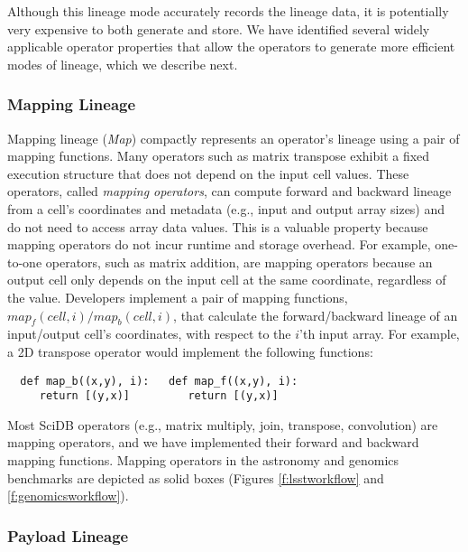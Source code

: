 Although this lineage mode accurately records the lineage data, it is
potentially very expensive to both generate and store.  We have identified
several widely applicable operator properties that allow the operators to
generate more efficient modes of lineage, which we describe next.


\subsubsection{Mapping Lineage}

Mapping lineage ({\it Map}) compactly represents an operator's lineage
using a pair of mapping functions.  Many operators such as matrix transpose
exhibit a fixed execution structure that does not depend on the input cell
values.  These operators, called {\it mapping operators}, can compute forward
and backward lineage from a cell's coordinates and metadata (e.g., input and
output array sizes) and do not need to access array data values.  This is a
valuable property because mapping operators do not incur runtime and storage
overhead.  For example, one-to-one operators, such as matrix addition, are
mapping operators because an output cell only depends on the input cell at the
same coordinate, regardless of the value.  Developers implement a pair of
mapping functions, $map_f(cell, i)/map_b(cell, i)$, that calculate the
forward/backward lineage of an input/output cell's coordinates, with respect to
the $i$'th input array.  For example, a 2D transpose operator would implement
the following functions:

{\footnotesize
\begin{verbatim}
  def map_b((x,y), i):   def map_f((x,y), i):
     return [(y,x)]         return [(y,x)]
\end{verbatim}
}

Most SciDB operators (e.g., matrix multiply, join,
transpose,  convolution) are mapping operators, and we have
implemented their forward and backward mapping functions.  Mapping
operators in the astronomy and genomics benchmarks are depicted as
solid boxes (Figures \ref{f:lsstworkflow} and
\ref{f:genomicsworkflow}).

\subsubsection{Payload Lineage}

